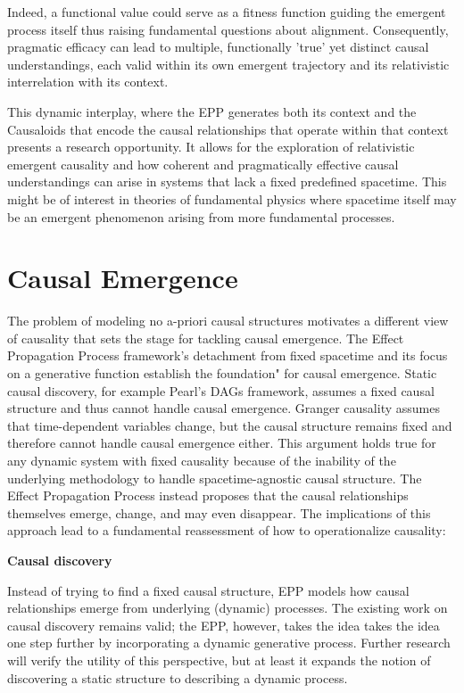 \documentclass{article}
\begin{document}
Indeed, a functional value could serve as a fitness function guiding the emergent process itself thus raising fundamental questions about alignment. Consequently, pragmatic efficacy can lead to multiple, functionally 'true' yet distinct causal understandings, each valid within its own emergent trajectory and its relativistic interrelation with its context.

This dynamic interplay, where the EPP generates both its context and the Causaloids that encode the causal relationships that operate within that context presents a research opportunity. It allows for the exploration of relativistic emergent causality and how coherent and pragmatically effective causal understandings can arise in systems that lack a fixed predefined spacetime. This might be of interest in theories of fundamental physics where spacetime itself may be an emergent phenomenon arising from more fundamental processes.

\section{Causal Emergence}
\label{sec:causal_emergence}

The problem of modeling no a-priori causal structures motivates a different view of causality that sets the stage for tackling  causal emergence. The Effect Propagation Process framework's detachment from fixed spacetime and its focus on a generative function establish the foundation" for causal emergence. Static causal discovery, for example Pearl’s DAGs framework, assumes a fixed causal structure and thus cannot handle causal emergence. Granger causality assumes that time-dependent variables change, but the causal structure remains fixed and therefore cannot handle causal emergence either. This argument holds true for any dynamic system with fixed causality because of the inability of the underlying methodology to handle spacetime-agnostic causal structure. The Effect Propagation Process instead proposes that the causal relationships themselves emerge, change, and may even disappear. The implications of this approach lead to a fundamental reassessment of how to operationalize causality:

\textbf{Causal discovery}

Instead of trying to find a fixed causal structure, EPP models how causal relationships emerge from underlying (dynamic) processes. The existing work on causal discovery remains valid; the EPP, however, takes the idea takes the idea one step further by incorporating a dynamic generative process. Further research will verify the utility of this perspective, but at least it expands the notion of discovering a static structure to describing a dynamic process.
\end{document}
